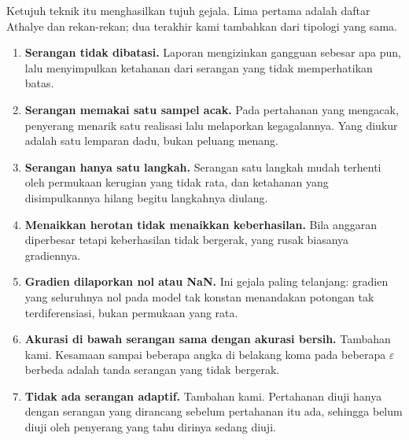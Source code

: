 Ketujuh teknik itu menghasilkan tujuh gejala. Lima pertama adalah daftar Athalye dan
rekan-rekan; dua terakhir kami tambahkan dari tipologi yang sama.

\begin{enumerate}
  \item \textbf{Serangan tidak dibatasi.} Laporan mengizinkan gangguan sebesar apa pun,
        lalu menyimpulkan ketahanan dari serangan yang tidak memperhatikan batas.
  \item \textbf{Serangan memakai satu sampel acak.} Pada pertahanan yang mengacak,
        penyerang menarik satu realisasi lalu melaporkan kegagalannya. Yang diukur adalah
        satu lemparan dadu, bukan peluang menang.
  \item \textbf{Serangan hanya satu langkah.} Serangan satu langkah mudah terhenti oleh
        permukaan kerugian yang tidak rata, dan ketahanan yang disimpulkannya hilang
        begitu langkahnya diulang.
  \item \textbf{Menaikkan herotan tidak menaikkan keberhasilan.} Bila anggaran diperbesar
        tetapi keberhasilan tidak bergerak, yang rusak biasanya gradiennya.
  \item \textbf{Gradien dilaporkan nol atau NaN.} Ini gejala paling telanjang: gradien
        yang seluruhnya nol pada model tak konstan menandakan potongan tak
        terdiferensiasi, bukan permukaan yang rata.
  \item \textbf{Akurasi di bawah serangan sama dengan akurasi bersih.} Tambahan kami.
        Kesamaan sampai beberapa angka di belakang koma pada beberapa $\varepsilon$
        berbeda adalah tanda serangan yang tidak bergerak.
  \item \textbf{Tidak ada serangan adaptif.} Tambahan kami. Pertahanan diuji hanya
        dengan serangan yang dirancang sebelum pertahanan itu ada, sehingga belum diuji
        oleh penyerang yang tahu dirinya sedang diuji.
\end{enumerate}




